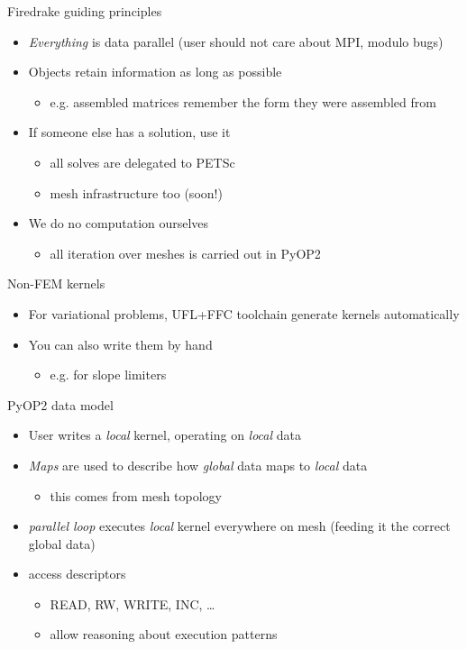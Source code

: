 \documentclass[bigger]{beamer}
\begin{document}
\begin{frame}[label={sec:orgheadline9}]{Firedrake guiding principles}
\begin{itemize}
\item \emph{Everything} is data parallel (user should not care about MPI,
modulo bugs)
\item Objects retain information as long as possible
\begin{itemize}
\item e.g. assembled matrices remember the form they were assembled from
\end{itemize}
\item If someone else has a solution, use it
\begin{itemize}
\item all solves are delegated to PETSc
\item mesh infrastructure too (soon!)
\end{itemize}
\item We do no computation ourselves
\begin{itemize}
\item all iteration over meshes is carried out in PyOP2
\end{itemize}
\end{itemize}
\end{frame}

\begin{frame}[label={sec:orgheadline10}]{Non-FEM kernels}
\begin{itemize}
\item For variational problems, UFL+FFC toolchain generate kernels
automatically
\item You can also write them by hand
\begin{itemize}
\item e.g. for slope limiters
\end{itemize}
\end{itemize}
\end{frame}

\begin{frame}[label={sec:orgheadline11}]{PyOP2 data model}
\begin{itemize}
\item User writes a \emph{local} kernel, operating on \emph{local} data
\item \emph{Maps} are used to describe how \emph{global} data maps to \emph{local} data
\begin{itemize}
\item this comes from mesh topology
\end{itemize}
\item \emph{parallel loop} executes \emph{local} kernel everywhere on mesh (feeding
it the correct global data)
\item access descriptors
\begin{itemize}
\item READ, RW, WRITE, INC, \ldots{}
\item allow reasoning about execution patterns
\end{itemize}
\end{itemize}
\end{frame}
\end{document}
